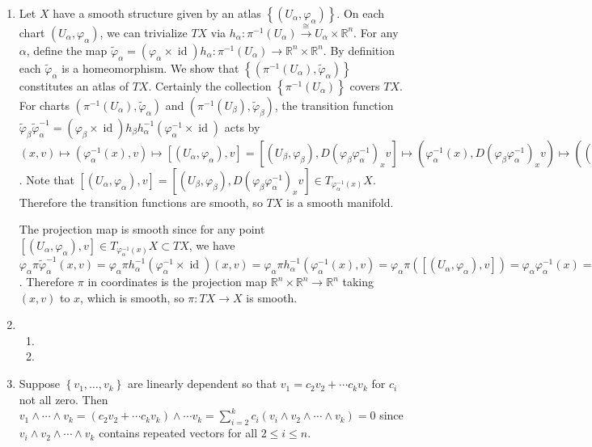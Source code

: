 \documentclass[11pt,leqno]{article}
\theoremstyle{plain}
\theoremstyle{definition}
\numberwithin{equation}{section}
\numberwithin{lem}{section}
\newcommand{\cbr}[1]{\left\{#1\right\}}
\DeclareMathOperator{\id}{id}
\begin{document}
\begin{enumerate}
    \item Let $X$ have a smooth structure given by an atlas $\cbr{(U_\alpha,\varphi_\alpha)}$. On each chart $(U_\alpha,\varphi_\alpha)$, we can trivialize $TX$ via $h_\alpha\colon \pi^{-1}(U_\alpha)\xrightarrow{\cong} U_\alpha\times \mathbb R^n$. For any $\alpha$, define the map $\tilde\varphi_\alpha = (\varphi_\alpha\times \id)h_\alpha \colon \pi^{-1}(U_\alpha) \to \mathbb R^n\times \mathbb R^n$. By definition each $\tilde\varphi_\alpha$ is a homeomorphism. We show that $\cbr{(\pi^{-1}(U_\alpha), \tilde\varphi_\alpha)}$ constitutes an atlas of $TX$. Certainly the collection $\cbr{\pi^{-1}(U_\alpha)}$ covers $TX$. For charts $(\pi^{-1}(U_\alpha), \tilde\varphi_\alpha)$ and $(\pi^{-1}(U_\beta), \tilde\varphi_\beta)$, the transition function $\tilde\varphi_\beta\tilde\varphi_\alpha^{-1} = (\varphi_\beta\times \id)h_\beta h_\alpha^{-1}(\varphi_\alpha^{-1}\times\id)$ acts by $(x,v)\mapsto (\varphi_\alpha^{-1}(x),v)\mapsto [(U_\alpha,\varphi_\alpha),v] = [(U_\beta,\varphi_\beta),D(\varphi_\beta\varphi_\alpha^{-1})_{x}v]\mapsto (\varphi_\alpha^{-1}(x),D(\varphi_\beta\varphi_\alpha^{-1})_{x}v)\mapsto ((\varphi_\beta\varphi_\alpha^{-1})(x),D(\varphi_\beta\varphi_\alpha^{-1})_{x}v)$. Note that $[(U_\alpha,\varphi_\alpha),v] = [(U_\beta,\varphi_\beta),D(\varphi_\beta\varphi_\alpha^{-1})_{x}v]\in T_{\varphi_\alpha^{-1}(x)}X$. Therefore the transition functions are smooth, so $TX$ is a smooth manifold.
    
    The projection map is smooth since for any point $[(U_\alpha,\varphi_\alpha),v]\in T_{\varphi_\alpha^{-1}(x)}X\subset TX$, we have $\varphi_\alpha \pi \tilde\varphi_\alpha^{-1}(x,v) = \varphi_\alpha\pi h_\alpha^{-1}(\varphi_\alpha^{-1}\times \id)(x,v) = \varphi_\alpha\pi h_\alpha^{-1}(\varphi_\alpha^{-1}(x),v) = \varphi_\alpha\pi([(U_\alpha,\varphi_\alpha),v]) = \varphi_\alpha\varphi_\alpha^{-1}(x) = x$. Therefore $\pi$ in coordinates is the projection map $\mathbb R^n\times \mathbb R^n\to \mathbb R^n$ taking $(x,v)$ to $x$, which is smooth, so $\pi\colon TX\to X$ is smooth.
    \item \begin{enumerate}
        \item 
        \item 
    \end{enumerate}
    \item Suppose $\cbr{v_1,\dots,v_k}$ are linearly dependent so that $v_1 = c_2v_2 + \cdots c_kv_k$ for $c_i$ not all zero. Then $v_1\wedge\cdots \wedge v_k = (c_2v_2 + \cdots c_kv_k)\wedge\cdots v_k = \sum_{i=2}^k c_i(v_i\wedge v_2\wedge \cdots\wedge v_k) = 0$ since $v_i\wedge v_2\wedge \cdots\wedge v_k$ contains repeated vectors for all $2\leq i\leq n$.


\end{enumerate}
\end{document}
